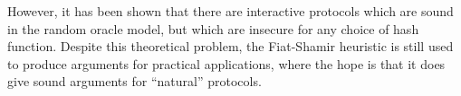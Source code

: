 However, it has been shown \cite{Canetti2000,Goldwasser2003} that there are interactive protocols which are sound in the random oracle model, but which are insecure for any choice of hash function. Despite this theoretical problem, the Fiat-Shamir heuristic is still used to produce arguments for practical applications, where the hope is that it does give sound arguments for ``natural'' protocols.
%
%
%
%
%
%
%
%
%
% 
